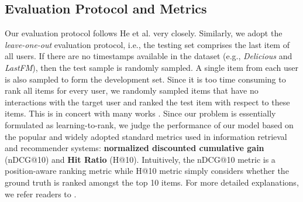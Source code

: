 \documentclass[sigconf]{acmart}
\begin{document}
\subsection{Evaluation Protocol and Metrics}
Our evaluation protocol follows He et al. \cite{He:2017:NCF:3038912.3052569} very closely. Similarly, we adopt the \textit{leave-one-out} evaluation protocol, i.e., the testing set comprises the last item of all users. If there are no timestamps available in the dataset (e.g., \textit{Delicious} and \textit{LastFM}), then the test sample is randomly sampled. A single item from each user is also sampled to form the development set. Since it is too time consuming to rank all items for every user, we randomly sampled  items that have no interactions with the target user and ranked the test item with respect to these  items. This is in concert with many works  \cite{DBLP:conf/www/BayerHKR17,DBLP:conf/sigir/HeZKC16,DBLP:conf/uai/RendleFGS09,He:2017:NCF:3038912.3052569}. Since our problem is essentially formulated as learning-to-rank, we judge the performance of our model based on the popular and widely adopted standard metrics used in information retrieval and recommender systems: \textbf{normalized discounted cumulative gain} (nDCG@10) \cite{DBLP:journals/tois/JarvelinK02} and \textbf{Hit Ratio} (H@10). Intuitively, the nDCG@10 metric is a position-aware ranking metric while H@10 metric simply considers whether the ground truth is ranked amongst the top 10 items. For more detailed explanations, we refer readers to \cite{He:2017:NCF:3038912.3052569}.
\end{document}
